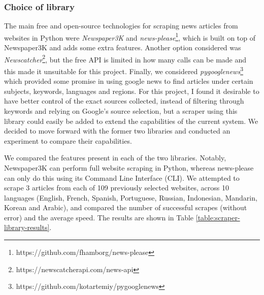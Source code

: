 \documentclass{l4proj}
\begin{document}
\subsubsection{Choice of library} \hfill \par
The main free and open-source technologies for scraping news articles from websites in Python were \emph{Newspaper3K} and \emph{news-please}\footnote{https://github.com/fhamborg/news-please}, which is built on top of Newspaper3K and adds some extra features. Another option considered was \emph{Newscatcher}\footnote{https://newscatcherapi.com/news-api}, but the free API is limited in how many calls can be made and this made it unsuitable for this project. Finally, we considered \emph{pygooglenews}\footnote{https://github.com/kotartemiy/pygooglenews} which provided some promise in using google news to find articles under certain subjects, keywords, languages and regions. For this project, I found it desirable to have better control of the exact sources collected, instead of filtering through keywords and relying on Google's source selection, but a scraper using this library could easily be added to extend the capabilities of the current system. We decided to move forward with the former two libraries and conducted an experiment to compare their capabilities. \par

We compared the features present in each of the two libraries. Notably, Newspaper3K can perform full website scraping in Python, whereas news-please can only do this using its Command Line Interface (CLI). We attempted to scrape 3 articles from each of 109 previously selected websites, across 10 languages (English, French, Spanish, Portuguese, Russian, Indonesian, Mandarin, Korean and Arabic), and compared the number of successful scrapes (without error) and the average speed. The results are shown in Table \ref{table:scraper-library-results}. \par 
\end{document}
